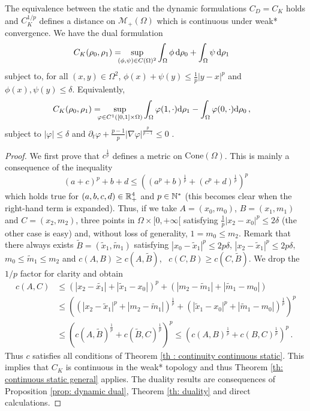 \begin{theorem}\label{th:POT dyn/stat}
The equivalence between the static and the dynamic formulations $C_D=C_K$ holds and $C_K^{1/p}$ defines a distance on $\mathcal{M}_+(\Omega)$ which is continuous under weak* convergence. We have the dual formulation
\begin{align*}
C_K(\rho_0,\rho_1) &=  \!\!\!\! \sup_{(\phi,\psi) \in C(\Omega)^2} \int_{\Omega} \phi \, \mathrm{d} \rho_0 + \int_{\Omega} \psi \, \mathrm{d} \rho_1
\end{align*}
subject to, for all $(x,y)\in \Omega^2$, $ \phi(x) + \psi(y) \leq \frac1p |y-x|^p$ and $\phi(x), \psi(y) \leq \delta$. Equivalently, 
\begin{align*}
C_K(\rho_0,\rho_1) &= \!\!\!\! \sup_{\varphi \in C^1([0,1]\times \Omega)} \int_{\Omega} \varphi(1,\cdot) \mathrm{d} \rho_1 - \int_{\Omega} \varphi(0,\cdot) \mathrm{d} \rho_0 \, ,
\end{align*}
subject to $ |\varphi| \leq \delta $ and $ \partial_t \varphi + \frac{p-1}{p} |\nabla \varphi|^\frac{p}{p-1} \leq 0 $ .

\end{theorem}
\begin{proof}
We first prove that $c^\frac1p$ defines a metric on $\text{Cone}(\Omega)$. This is mainly a consequence of the inequality
\[
(a+c)^p+b+d \leq \left( (a^p+b)^\frac1p + (c^p+d)^\frac1p \right)^p
\]
which holds true for $(a,b,c,d)\in \mathbb{R}_+^4$ and $p\in\mathbb{N}^*$ (this becomes clear when the right-hand term is expanded). Thus, if we take $A=(x_0,m_0)$, $B=(x_1,m_1)$ and $C=(x_2,m_2)$, three points in $\Omega \times [0,+\infty[$ satisfying $\frac1p |x_2-x_0|^p\leq 2\delta$ (the other case is easy) and, without loss of generality, $1 = m_0 \leq m_2$. Remark that there always exists $\tilde{B}=(\tilde{x}_1,\tilde{m}_1)$ satisfying $|x_0-\tilde{x}_1|^p\leq2p\delta$, $|x_2-\tilde{x}_1|^p\leq 2p \delta$, $m_0\leq \tilde{m}_1 \leq m_2$ and $c(A,B)\geq c(A,\tilde{B})$, \, $c(C,B)\geq c(C,\tilde{B})$.
We drop the $1/p$ factor for clarity and obtain
\begin{align*}
c(A,C) &\leq \left(|x_2-\tilde{x_1}|+|\tilde{x}_1-x_0| \right)^p+ (|m_2-\tilde{m}_1|+|\tilde{m}_1-m_0|)\\
& \leq \left( \left( |x_2-\tilde{x}_1|^p+|m_2-\tilde{m}_1| \right)^\frac1p + \left( |\tilde{x}_1-x_0|^p+|\tilde{m}_1-m_0| \right)^\frac1p \right)^p \\
& \leq \left( c(A,\tilde{B})^\frac1p + c(\tilde{B},C)^\frac1p \right)^p \leq \left( c(A,B)^\frac1p + c(B,C)^\frac1p \right)^p\, .
\end{align*}
  Thus $c$ satisfies all conditions of Theorem \ref{th : continuity continuous static}. This implies that $C_K$ is continuous in the weak* topology and thus Theorem \ref{th: continuous static general} applies. The duality results are consequences of Proposition \ref{prop: dynamic dual},  Theorem \ref{th: duality} and direct calculations.
\end{proof}




